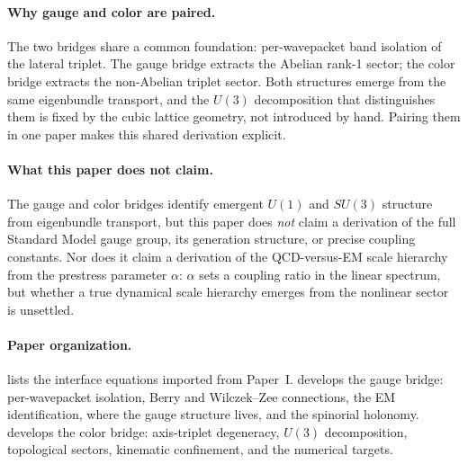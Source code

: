 \paragraph{Why gauge and color are paired.}
The two bridges share a common foundation: per-wavepacket band isolation of the lateral triplet.
The gauge bridge extracts the Abelian rank-1 sector; the color bridge extracts the non-Abelian
triplet sector.
Both structures emerge from the same eigenbundle transport, and the $U(3)$ decomposition that
distinguishes them is fixed by the cubic lattice geometry, not introduced by hand.
Pairing them in one paper makes this shared derivation explicit.

\paragraph{What this paper does not claim.}
The gauge and color bridges identify emergent $U(1)$ and $SU(3)$ structure from eigenbundle
transport, but this paper does \emph{not} claim a derivation of the full Standard Model gauge
group, its generation structure, or precise coupling constants.
Nor does it claim a derivation of the QCD-versus-EM scale hierarchy from the prestress parameter
$\alpha$: $\alpha$ sets a coupling ratio in the linear spectrum, but whether a true dynamical
scale hierarchy emerges from the nonlinear sector is unsettled.

\paragraph{Paper organization.}
 lists the interface equations imported from Paper~I.
 develops the gauge bridge: per-wavepacket isolation, Berry and Wilczek--Zee
connections, the EM identification, where the gauge structure lives, and the spinorial holonomy.
 develops the color bridge: axis-triplet degeneracy, $U(3)$ decomposition,
topological sectors, kinematic confinement, and the numerical targets.